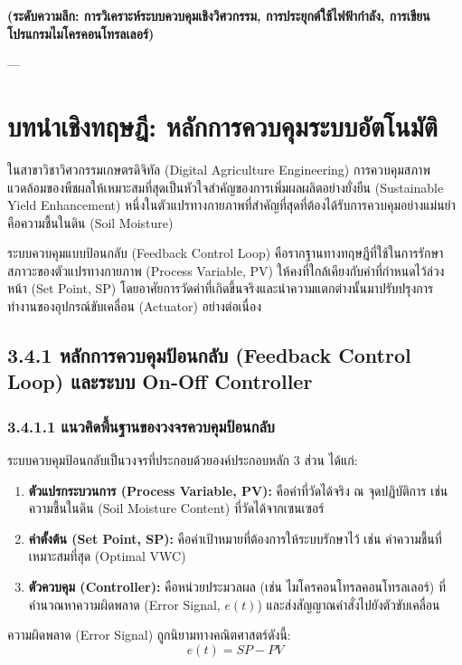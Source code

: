\documentclass[11pt,a4paper,openany]{report}
\begin{document}
\textbf{(ระดับความลึก: การวิเคราะห์ระบบควบคุมเชิงวิศวกรรม, การประยุกต์ใช้ไฟฟ้ากำลัง, การเขียนโปรแกรมไมโครคอนโทรลเลอร์)}

---

\section{บทนำเชิงทฤษฎี: หลักการควบคุมระบบอัตโนมัติ}


ในสาขาวิชาวิศวกรรมเกษตรดิจิทัล (Digital Agriculture Engineering) การควบคุมสภาพแวดล้อมของพืชผลให้เหมาะสมที่สุดเป็นหัวใจสำคัญของการเพิ่มผลผลิตอย่างยั่งยืน (Sustainable Yield Enhancement) หนึ่งในตัวแปรทางกายภาพที่สำคัญที่สุดที่ต้องได้รับการควบคุมอย่างแม่นยำคือความชื้นในดิน (Soil Moisture)

ระบบควบคุมแบบป้อนกลับ (Feedback Control Loop) คือรากฐานทางทฤษฎีที่ใช้ในการรักษาสภาวะของตัวแปรทางกายภาพ (Process Variable, PV) ให้คงที่ใกล้เคียงกับค่าที่กำหนดไว้ล่วงหน้า (Set Point, SP) โดยอาศัยการวัดค่าที่เกิดขึ้นจริงและนำความแตกต่างนั้นมาปรับปรุงการทำงานของอุปกรณ์ขับเคลื่อน (Actuator) อย่างต่อเนื่อง

\subsection{3.4.1 หลักการควบคุมป้อนกลับ (Feedback Control Loop) และระบบ On-Off Controller}


\subsubsection{3.4.1.1 แนวคิดพื้นฐานของวงจรควบคุมป้อนกลับ}


ระบบควบคุมป้อนกลับเป็นวงจรที่ประกอบด้วยองค์ประกอบหลัก 3 ส่วน ได้แก่:
\begin{enumerate}
  \item \textbf{ตัวแปรกระบวนการ (Process Variable, PV):} คือค่าที่วัดได้จริง ณ จุดปฏิบัติการ เช่น ความชื้นในดิน (Soil Moisture Content) ที่วัดได้จากเซนเซอร์
  \item \textbf{ค่าตั้งต้น (Set Point, SP):} คือค่าเป้าหมายที่ต้องการให้ระบบรักษาไว้ เช่น ค่าความชื้นที่เหมาะสมที่สุด (Optimal VWC)
  \item \textbf{ตัวควบคุม (Controller):} คือหน่วยประมวลผล (เช่น ไมโครคอนโทรลคอนโทรลเลอร์) ที่คำนวณหาความผิดพลาด (Error Signal, $e(t)$) และส่งสัญญาณคำสั่งไปยังตัวขับเคลื่อน
\end{enumerate}


ความผิดพลาด (Error Signal) ถูกนิยามทางคณิตศาสตร์ดังนี้:
$$e(t) = SP - PV$$
\end{document}
